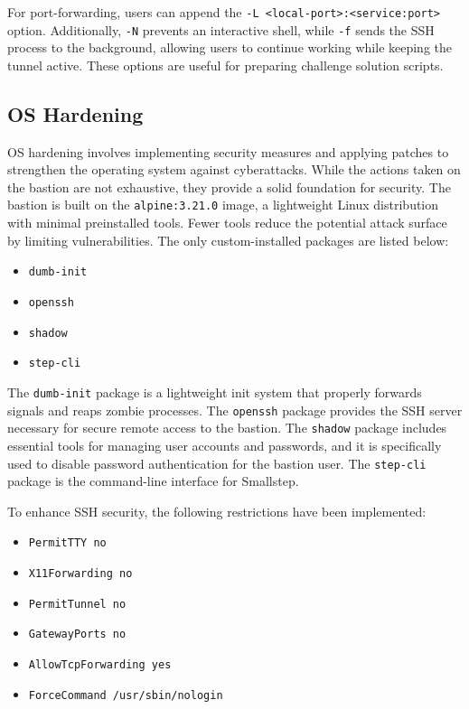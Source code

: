 For port-forwarding, users can append the \texttt{-L <local-port>:<service:port>} option. Additionally, \texttt{-N} prevents an interactive shell, while \texttt{-f} sends the SSH process to the background, allowing users to continue working while keeping the tunnel active. These options are useful for preparing challenge solution scripts.

\subsection{OS Hardening}
OS hardening involves implementing security measures and applying patches to strengthen the operating system against cyberattacks. While the actions taken on the bastion are not exhaustive, they provide a solid foundation for security. The bastion is built on the \texttt{alpine:3.21.0} image, a lightweight Linux distribution with minimal preinstalled tools. Fewer tools reduce the potential attack surface by limiting vulnerabilities. The only custom-installed packages are listed below:

\begin{multicols}{2} 
    \begin{itemize}
        \item \texttt{dumb-init}
        \item \texttt{openssh}
        \item \texttt{shadow}
        \item \texttt{step-cli}
    \end{itemize}
\end{multicols}

The \texttt{dumb-init} package is a lightweight init system that properly forwards signals and reaps zombie processes. The \texttt{openssh} package provides the SSH server necessary for secure remote access to the bastion. The \texttt{shadow} package includes essential tools for managing user accounts and passwords, and it is specifically used to disable password authentication for the bastion user. The \texttt{step-cli} package is the command-line interface for Smallstep.

To enhance SSH security, the following restrictions have been implemented:

\begin{multicols}{2} 
    \begin{itemize}
        \item \texttt{PermitTTY no}
        \item \texttt{X11Forwarding no}
        \item \texttt{PermitTunnel no}
        \item \texttt{GatewayPorts no}
        \item \texttt{AllowTcpForwarding yes}
        \item \texttt{ForceCommand /usr/sbin/\allowbreak nologin}
    \end{itemize}
\end{multicols}


